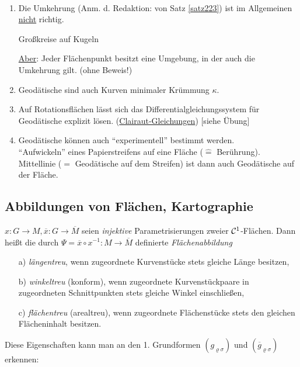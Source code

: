 \begin{bemerkung}\(\)
 \begin{enumerate}
  \item Die Umkehrung (Anm. d. Redaktion: von Satz \ref{satz223}) ist im Allgemeinen \uline{nicht} richtig.
  \begin{bsp}
   Großkreise auf Kugeln
  \end{bsp}
  \uline{Aber}: Jeder Flächenpunkt besitzt eine Umgebung, in der auch die Umkehrung gilt. (ohne Beweis!)
  \item Geodätische sind auch Kurven minimaler Krümmung \(\kappa\).
  \item Auf Rotationsflächen lässt sich das Differentialgleichungssystem für Geodätische explizit lösen. (\uline{Clairaut-Gleichungen}) [siehe Übung]
  \item Geodätische können auch "`experimentell"' bestimmt werden. \\
  "`Aufwickeln"' eines Papierstreifens auf eine Fläche (\(\widehat{=}\) Berührung). Mittellinie (\(=\) Geodätische auf dem Streifen) ist dann auch Geodätische auf der Fläche.
 \end{enumerate}

\end{bemerkung}

\subsection{Abbildungen von Flächen, Kartographie}
\begin{definition}
 \(x \colon G \to M, \overline x\colon G \to \overline M\) seien \textit{injektive} Parametrisierungen zweier \(\mathcal{C}^1\)-Flächen. Dann heißt die durch \(\Psi = \overline x \circ x^{-1}\colon M \to \overline M\) definierte \textit{Flächenabbildung}
 \begin{enumerate}
 \item[a)] \textit{längentreu}, wenn zugeordnete Kurvenstücke stets gleiche Länge besitzen,
 \item[b)] \textit{winkeltreu} (konform), wenn zugeordnete Kurvenstückpaare in zugeordneten Schnittpunkten stets gleiche Winkel einschließen,
 \item[c)] \textit{flächentreu} (arealtreu), wenn zugeordnete Flächenstücke stets den gleichen Flächeninhalt besitzen.      
 \end{enumerate}
\end{definition}

Diese Eigenschaften kann man an den 1. Grundformen \((g_{\varrho \sigma})\) und \((\overline g_{\varrho \sigma})\) erkennen:

